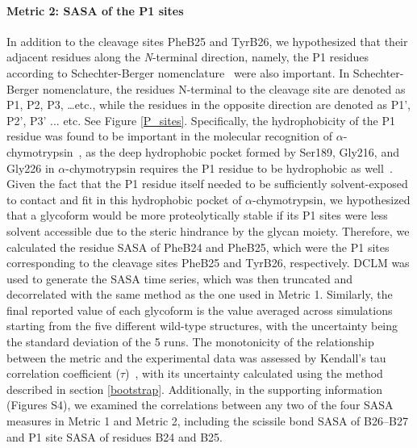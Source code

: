 \documentclass[sn-vancouver]{sn-jnl}
\begin{document}
\paragraph{Metric 2: SASA of the P1 sites}
In addition to the cleavage sites PheB25 and TyrB26, we hypothesized that their adjacent residues along the \emph{N}-terminal direction, namely, the P1 residues according to Schechter-Berger nomenclature~\cite{schechter1968active} were also important. In Schechter-Berger nomenclature, the residues N-terminal to the cleavage site are denoted as P1, P2, P3, \ldots etc., while the residues in the opposite direction are denoted as P1', P2', P3' ... etc. See Figure \ref{P_sites}. Specifically, the hydrophobicity of the P1 residue was found to be important in the molecular recognition of $\alpha$-chymotrypsin~\cite{appel1986chymotrypsin}, as the deep hydrophobic pocket formed by Ser189, Gly216, and Gly226 in $\alpha$-chymotrypsin requires the P1 residue to be hydrophobic as well~\cite{hedstrom2002serine}. Given the fact that the P1 residue itself needed to be sufficiently solvent-exposed to contact and fit in this hydrophobic pocket of $\alpha$-chymotrypsin, we hypothesized that a glycoform would be more proteolytically stable if its P1 sites were less solvent accessible due to the steric hindrance by the glycan moiety. Therefore, we calculated the residue SASA of PheB24 and PheB25, which were the P1 sites corresponding to the cleavage sites PheB25 and TyrB26, respectively. DCLM was used to generate the SASA time series, which was then truncated and decorrelated with the same method as the one used in Metric 1. Similarly, the final reported value of each glycoform is the value averaged across simulations starting from the five different wild-type structures, with the uncertainty being the standard deviation of the 5 runs. The monotonicity of the relationship between the metric and the experimental data was assessed by Kendall's tau correlation coefficient ($\tau$)~\cite{kendall1948advanced}, with its uncertainty calculated using the method described in section \ref{bootstrap}. Additionally, in the supporting information (Figures S4), we examined the correlations between any two of the four SASA measures in Metric 1 and Metric 2, including the scissile bond SASA of B26--B27 and P1 site SASA of residues B24 and B25. 
\end{document}
